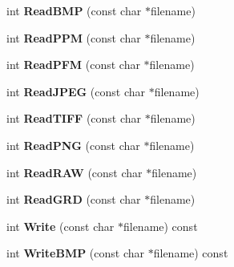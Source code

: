 \begin{DoxyCompactItemize}
\item 
int {\bfseries Read\+B\+MP} (const char $\ast$filename)\hypertarget{class_r2_image_a8d96e01dc5287abf28f93390b0b3ced2}{}\label{class_r2_image_a8d96e01dc5287abf28f93390b0b3ced2}

\item 
int {\bfseries Read\+P\+PM} (const char $\ast$filename)\hypertarget{class_r2_image_a543b1236144a9f6545ff52b80ba6de3d}{}\label{class_r2_image_a543b1236144a9f6545ff52b80ba6de3d}

\item 
int {\bfseries Read\+P\+FM} (const char $\ast$filename)\hypertarget{class_r2_image_af652b4c51758b146fa0430061549336e}{}\label{class_r2_image_af652b4c51758b146fa0430061549336e}

\item 
int {\bfseries Read\+J\+P\+EG} (const char $\ast$filename)\hypertarget{class_r2_image_a59e0c1f9c18c8ce9fda982bb77b4ef73}{}\label{class_r2_image_a59e0c1f9c18c8ce9fda982bb77b4ef73}

\item 
int {\bfseries Read\+T\+I\+FF} (const char $\ast$filename)\hypertarget{class_r2_image_a0387ee87105c5d7be6d70dadabbc63f4}{}\label{class_r2_image_a0387ee87105c5d7be6d70dadabbc63f4}

\item 
int {\bfseries Read\+P\+NG} (const char $\ast$filename)\hypertarget{class_r2_image_a8c3fd9d5a11a87632807a486c7f08bb1}{}\label{class_r2_image_a8c3fd9d5a11a87632807a486c7f08bb1}

\item 
int {\bfseries Read\+R\+AW} (const char $\ast$filename)\hypertarget{class_r2_image_ab3259bb3ff3d474c459c8af154255fc8}{}\label{class_r2_image_ab3259bb3ff3d474c459c8af154255fc8}

\item 
int {\bfseries Read\+G\+RD} (const char $\ast$filename)\hypertarget{class_r2_image_ae6c186de4a83c08654c5de442feca1f5}{}\label{class_r2_image_ae6c186de4a83c08654c5de442feca1f5}

\item 
int {\bfseries Write} (const char $\ast$filename) const \hypertarget{class_r2_image_aecd18801bf205fed67c7087124bf3d85}{}\label{class_r2_image_aecd18801bf205fed67c7087124bf3d85}

\item 
int {\bfseries Write\+B\+MP} (const char $\ast$filename) const \hypertarget{class_r2_image_a848c4a21037a9e575ea0e05b3717ed8e}{}\label{class_r2_image_a848c4a21037a9e575ea0e05b3717ed8e}


\end{DoxyCompactItemize}
